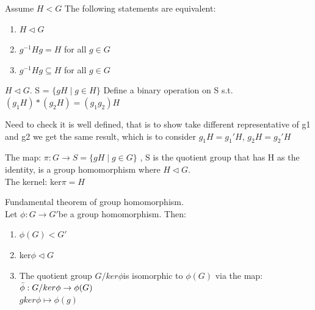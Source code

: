 \documentclass{article}
\begin{document}
\begin{theorem}
    Assume $H<G$ The following statements are equivalent:
    \begin{enumerate}
        \item $H \lhd G$
        \item $g^{-1}Hg = H$ for all $g \in G$
        \item  $g^{-1}Hg \subseteq H$  for all $g \in G$
    \end{enumerate}
\end{theorem}

\begin{Def}
    $H \lhd G$. S = $\{ gH \mid g \in H\}$ Define a binary operation on S s.t. $(g_1H) * (g_2H) = (g_1g_2)H$ 
\end{Def}
\begin{note}
       Need to check it is well defined, that is to show take different representative of g1 and g2 we get the same result, which is to consider $g_1H = g_1' H$, $g_2H = g_2'H$
\end{note}


\begin{theorem}
    The map: $\pi: G \rightarrow S = \{gH \mid g\in G\}$ , S is the quotient group that has H as the identity, is a group homomorphism where $H \lhd G$.
    \\The kernel: ker$\pi = H$
\end{theorem}

\begin{theorem}
    Fundamental theorem of group homomorphism. 
    \\Let $\phi: G \rightarrow G' $be a group homomorphism. Then:
\begin{enumerate}
    \item $\phi(G) < G' $
    \item ker$\phi \lhd G$
    \item The quotient group $G/ker\phi $is isomorphic to $\phi (G)$ via the map:
    \\ $\Bar{\phi}: G/ker\phi  \rightarrow \phi(G)$
    \\ $g ker \phi \mapsto \phi(g)$
\end{enumerate} 
\end{theorem}
\end{document}
